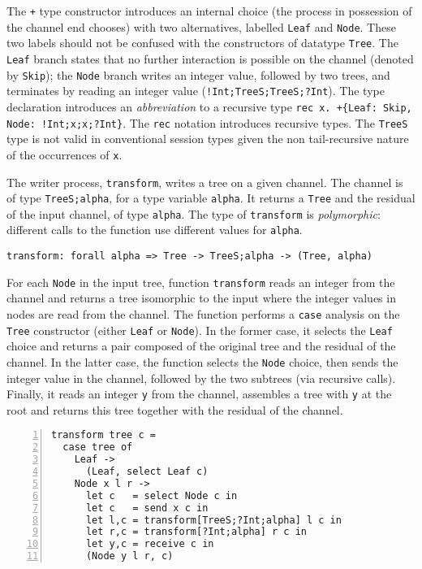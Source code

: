 The \lstinline|+| type constructor introduces an internal choice (the
process in possession of the channel end chooses) with two
alternatives, labelled \lstinline|Leaf| and \lstinline|Node|. These
two labels should not be confused with the constructors of datatype
\lstinline|Tree|. The \lstinline|Leaf| branch states that no further
interaction is possible on the channel (denoted by \lstinline|Skip|);
the \lstinline|Node| branch writes an integer value, followed by two
trees, and terminates by reading an integer value
(\lstinline|!Int;TreeS;TreeS;?Int|).
%
The type declaration introduces an \emph{abbreviation} to a recursive
type \lstinline|rec x. +{Leaf: Skip, Node: !Int;x;x;?Int}|.
%
The \lstinline|rec| notation introduces recursive types. The
\lstinline|TreeS| type is not valid in conventional session types
given the non tail-recursive nature of the occurrences of
\lstinline|x|.


The writer process, \lstinline|transform|, writes a tree on a given
channel. The channel is of type \lstinline|TreeS;alpha|, for
a type variable \lstinline|alpha|. It returns a \lstinline|Tree| and
the residual of the input channel, of type \lstinline|alpha|. The type
of \lstinline|transform| is \emph{polymorphic}: different calls to the
function use different values for \lstinline|alpha|.

\begin{lstlisting}
transform: forall alpha => Tree -> TreeS;alpha -> (Tree, alpha)
\end{lstlisting}

For each \lstinline|Node| in the input tree, function
\lstinline|transform| reads an integer from the channel and returns a
tree isomorphic to the input where the integer values in nodes are
read from the channel.
%
The function performs a \lstinline|case| analysis on the
\lstinline|Tree| constructor (either \lstinline|Leaf| or
\lstinline|Node|). In the former case, it selects the \lstinline|Leaf|
choice and returns a pair composed of the original tree and the
residual of the channel. In the latter case, the function selects the
\lstinline|Node| choice, then sends the integer value in the channel,
followed by the two subtrees (via recursive calls). Finally, it reads
an integer \lstinline|y| from the channel, assembles a tree with
\lstinline|y| at the root and returns this tree together with the
residual of the channel.
%
\begin{lstlisting}[numbers=left]
transform tree c =
  case tree of
    Leaf ->
      (Leaf, select Leaf c)
    Node x l r ->
      let c   = select Node c in
      let c   = send x c in
      let l,c = transform[TreeS;?Int;alpha] l c in
      let r,c = transform[?Int;alpha] r c in
      let y,c = receive c in
      (Node y l r, c)
\end{lstlisting}

